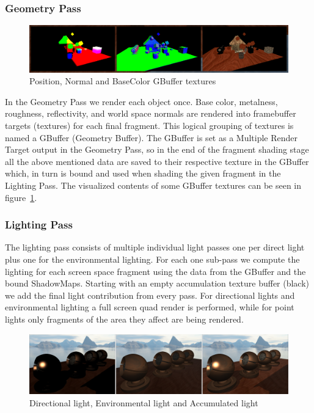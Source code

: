 \subsubsection{Geometry Pass}

\begin{figure}[ht]
    \centering
    \includegraphics[scale=0.3, clip=true]{./image/gbuffer.png}
    \caption{Position, Normal and BaseColor GBuffer textures}
\label{fig:gbuf}
\end{figure}

In the Geometry Pass we render each object once. Base color, metalness, roughness, reflectivity, and world space normals
are rendered into framebuffer targets (textures) for each final fragment. This logical grouping of textures is named
a GBuffer (Geometry Buffer). The GBuffer is set as a Multiple Render Target output in the Geometry Pass, so in the end
of the fragment shading stage all the above mentioned data are saved to their respective texture in the GBuffer which,
in turn is bound and used when shading the given fragment in the Lighting Pass. The visualized contents of some GBuffer
textures can be seen in figure~\ref{fig:gbuf}.

\subsubsection{Lighting Pass}

The lighting pass consists of multiple individual light passes one per direct light plus one for the
environmental lighting. For each one sub-pass we compute the lighting for each screen space fragment using
the data from the GBuffer and the bound ShadowMaps. Starting with an empty accumulation texture buffer (black)
we add the final light contribution from every pass. For directional lights and environmental lighting a full screen
quad render is performed, while for point lights only fragments of the area they affect are being rendered.

\begin{figure}[h]
    \centering
    \includegraphics[scale=0.18, clip=true]{./image/lightpasses.png}
    \caption{Directional light, Environmental light and Accumulated light}
\label{fig:lpasses}
\end{figure}

